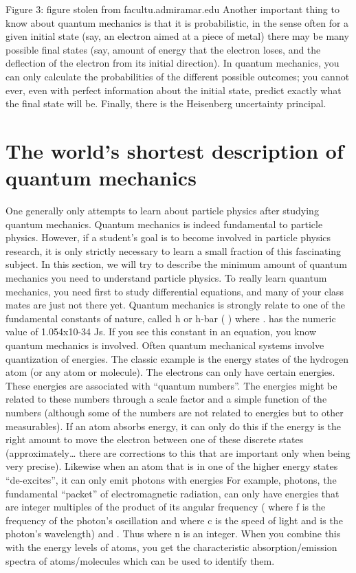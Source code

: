 Figure 3: figure stolen from facultu.admiramar.edu
Another important thing to know about quantum mechanics is that it is probabilistic, in the sense often for a given initial state (say, an electron aimed at a piece of metal) there may be many possible final states (say, amount of energy that the electron loses, and the deflection of the electron from its initial direction).  In quantum mechanics, you can only calculate the probabilities of the different possible outcomes; you cannot ever, even with perfect information about the initial state, predict exactly what the final state will be.
Finally, there is the Heisenberg uncertainty principal.  


\section{The world's shortest description of quantum mechanics}

One generally only attempts to learn about particle physics after studying quantum mechanics.  Quantum mechanics is indeed fundamental to particle physics.  However, if a student’s goal is to become involved in particle physics research, it is only strictly necessary to learn a small fraction of this fascinating subject.  In this section, we will try to describe the minimum amount of quantum mechanics you need to understand particle physics.  To really learn quantum mechanics, you need first to study differential equations, and many of your class mates are just not there yet.
Quantum mechanics is strongly relate to one of the fundamental constants of nature, called h or h-bar (  ) where  .    has the numeric value of 1.054x10-34 Js.  If you see this constant in an equation, you know quantum mechanics is involved.
Often quantum mechanical systems involve quantization of energies.  The classic example is the energy states of the hydrogen atom (or any atom or molecule).  The electrons can only have certain energies.  These energies are associated with ``quantum numbers''.  The energies might be related to these numbers through a scale factor and a simple function of the numbers (although some of the numbers are not related to energies but to other measurables).
If an atom absorbs energy, it can only do this if the energy is the right amount to move the electron between one of these discrete states (approximately… there are corrections to this that are important only when being very precise).  Likewise when an atom that is in one of the higher energy states “de-excites”, it can only emit photons with energies
For example, photons, the fundamental “packet” of electromagnetic radiation, can only have energies that are integer multiples of the product of its angular frequency (  where f is the frequency of the photon’s oscillation and   where c is the speed of light and   is the photon’s wavelength) and .  Thus   where n is an integer.
When you combine this with the energy levels of atoms, you get the characteristic absorption/emission spectra of atoms/molecules which can be used to identify them.


